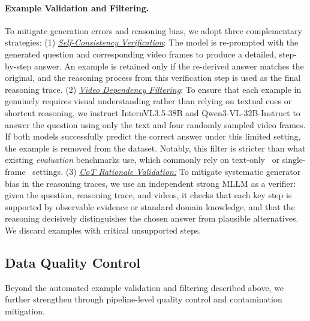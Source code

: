 \paragraph{Example Validation and Filtering.}
To mitigate generation errors and reasoning bias, we adopt three complementary strategies:
(1) \underline{\emph{Self-Consistency Verification}}: The model is re-prompted with the generated question and corresponding video frames to produce a detailed, step-by-step answer. An example is retained only if the re-derived answer matches the original, and the reasoning process from this verification step is used as the final reasoning trace.
(2) \underline{\emph{Video Dependency Filtering}}: To ensure that each example in \data genuinely requires visual understanding rather than relying on textual cues or shortcut reasoning, we instruct InternVL3.5-38B and Qwen3-VL-32B-Instruct to answer the question using only the text and four randomly sampled video frames. If both models successfully predict the correct answer under this limited setting, the example is removed from the dataset. Notably, this filter is stricter than what existing \emph{evaluation} benchmarks use, which commonly rely on text-only~\cite{videmme, di2024grounded} or single-frame~\cite{saravanan2025velociti, Plizzari2025OmniaDE} settings.
(3) \underline{\emph{CoT Rationale Validation:}} To mitigate systematic generator bias in the reasoning traces, we use an independent strong MLLM as a verifier: given the question, reasoning trace, and videos, it checks that each key step is supported by observable evidence or standard domain knowledge, and that the reasoning decisively distinguishes the chosen answer from plausible alternatives. We discard examples with critical unsupported steps.


\subsection{\data Data Quality Control}
\label{sec:data-quality}
Beyond the automated example validation and filtering described above, we further strengthen \data through pipeline-level quality control and contamination mitigation.

\vspace{-8pt}
